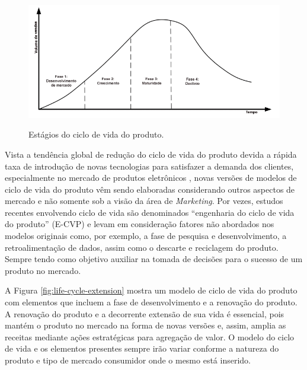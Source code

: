\documentclass[
	12pt,				%
	oneside,			%
	a4paper,			%
	english,			%
	brazil				%
]{abntex2}
\begin{document}
	\begin{figure}[H]
		\centering
		\caption{Estágios do ciclo de vida do produto.}
		\includegraphics[width=1\textwidth]{product-life-cycle.png}
		\label{fig:product-life-cycle}
	\end{figure}

	Vista a tendência global de redução do ciclo de vida do produto devida a rápida taxa de introdução de novas tecnologias para satisfazer a demanda dos clientes, especialmente no mercado de produtos eletrônicos \cite{trappey2008lifecycle}, novas versões de modelos de ciclo de vida do produto vêm sendo elaboradas considerando outros aspectos de mercado e não somente sob a visão da área de \textit{Marketing}. Por vezes, estudos recentes envolvendo ciclo de vida são denominados ``engenharia do ciclo de vida do produto'' (E-CVP) \cite{cao2012lifecycle} e levam em consideração fatores não abordados nos modelos originais como, por exemplo, a fase de pesquisa e desenvolvimento, a retroalimentação de dados, assim como o descarte e reciclagem do produto. Sempre tendo como objetivo auxiliar na tomada de decisões para o sucesso de um produto no mercado.
	
	A Figura \ref{fig:life-cycle-extension} mostra um modelo de ciclo de vida do produto com elementos que incluem a fase de desenvolvimento e a renovação do produto. A renovação do produto e a decorrente extensão de sua vida é essencial, pois mantém o produto no mercado na forma de novas versões e, assim, amplia as receitas mediante ações estratégicas para agregação de valor. O modelo do ciclo de vida e os elementos presentes sempre irão variar conforme a natureza do produto e tipo de mercado consumidor onde o mesmo está inserido.
	
\end{document}
